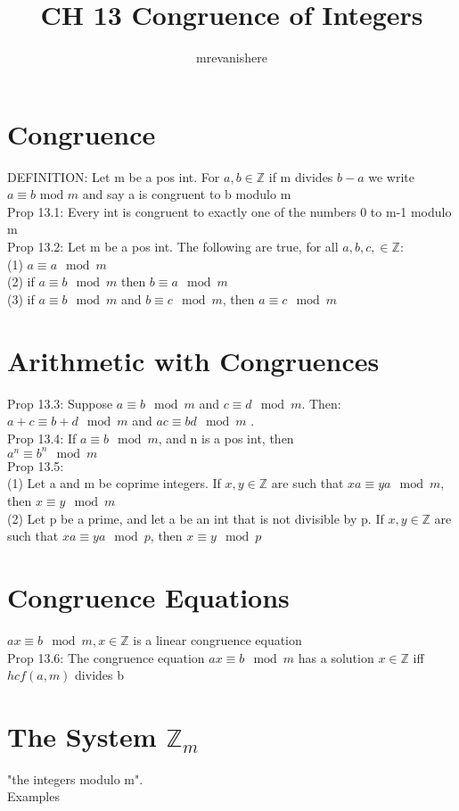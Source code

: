 \documentclass[12pt]{article}
\newcommand{\Z}{\mathbb{Z}}
\begin{document}
\title{CH 13 Congruence of Integers}
\author{mrevanishere}
\maketitle

\section{Congruence}
	DEFINITION: Let m be a pos int. For $ a, b\in\Z $ if m divides
	$ b - a $ we write $ a \equiv b \text{ mod } m $ and say a is
	congruent to b modulo m \\
	Prop 13.1: Every int is congruent to exactly one of the numbers
	0 to m-1 modulo m \\
	Prop 13.2: Let m be a pos int. The following are true,
	for all $ a, b, c, \in\Z $: \\
	(1) $ a \equiv a \mod m $ \\
	(2) if $ a \equiv b \mod m $ then $ b \equiv a \mod m $ \\
	(3) if $ a \equiv b \mod m $ and $ b \equiv c \mod m $, then
	$ a \equiv c \mod m $
\section{Arithmetic with Congruences}
	Prop 13.3: Suppose $ a \equiv b \mod m $ and $ c \equiv d \mod m $. Then:\\
	$ a + c \equiv b + d \mod m $ and $ ac \equiv bd \mod m$ . \\
	Prop 13.4: If $ a \equiv b \mod m $, and n is a pos int, then \\
	$ a^n \equiv b^n \mod m $ \\
	Prop 13.5: \\
	(1) Let a and m be coprime integers. If $ x, y \in\Z $ are such that
	$ xa \equiv ya \mod m $, then $ x \equiv y \mod m $ \\
	(2) Let p be a prime, and let a be an int that is not divisible by p.
	If $ x, y \in\Z $ are such that $ xa \equiv ya \mod p $, then
	$ x \equiv y \mod p $
\section{Congruence Equations}
	$ ax \equiv b \mod m, x\in\Z $ is a linear congruence equation \\
	Prop 13.6: The congruence equation $ ax \equiv b \mod m $ has a 
	solution $ x\in\Z $ iff $ hcf(a, m) $ divides b

\section{The System $ \Z_m $}
	"the integers modulo m". \\
	Examples
\end{document}
